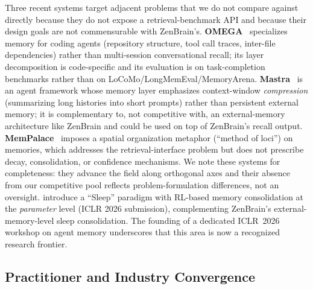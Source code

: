 \documentclass{article}
\begin{document}
Three recent systems target adjacent problems that we do not compare
against directly because they do not expose a retrieval-benchmark API
and because their design goals are not commensurable with ZenBrain's.
\textbf{OMEGA}~\citep{omega2026} specializes memory for coding agents
(repository structure, tool call traces, inter-file dependencies) rather
than multi-session conversational recall; its layer decomposition is
code-specific and its evaluation is on task-completion benchmarks rather
than on LoCoMo/LongMemEval/MemoryArena.
\textbf{Mastra}~\citep{mastra2025} is an agent framework whose
memory layer emphasizes context-window \emph{compression} (summarizing
long histories into short prompts) rather than persistent external
memory; it is complementary to, not competitive with, an external-memory
architecture like ZenBrain and could be used on top of ZenBrain's
recall output.
\textbf{MemPalace}~\citep{mempalace2025} imposes a spatial
organization metaphor (``method of loci'') on memories, which addresses
the retrieval-interface problem but does not prescribe decay,
consolidation, or confidence mechanisms.  We note these systems for
completeness: they advance the field along orthogonal axes and their
absence from our competitive pool reflects problem-formulation
differences, not an oversight.
\citet{lmneedsleep2026} introduce a ``Sleep'' paradigm with RL-based
memory consolidation at the \emph{parameter} level (ICLR 2026 submission),
complementing ZenBrain's external-memory-level sleep consolidation.
The founding of a dedicated ICLR~2026 workshop on agent memory
\citep{iclr2026memagents} underscores that this area is now a recognized
research frontier.

\subsection{Practitioner and Industry Convergence}
\end{document}

